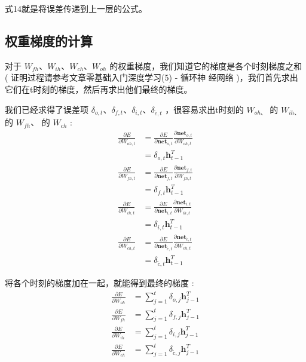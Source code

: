 \documentclass[10.5pt,compsoc]{CjC}
\theoremstyle{mystyle}
\begin{document}
式14就是将误差传递到上一层的公式。\\

{\heiti \subsection{权重梯度的计算} }
对于 $W_{f h} 、 W_{i h} 、 W_{c h} 、 W_{o h}$ 的权重梯度，我们知道它的梯度是各个时刻梯度之和 ( 证明过程请参考文章零基础入门深度学习(5) - 循环神 经网络 )，我们首先求出它们在t时刻的梯度，然后再求出他们最终的梯度。

我们已经求得了误差项 $\delta_{o, t} 、 \delta_{f, t} 、 \delta_{i, t} 、 \delta_{\tilde{c}, t}$ ，很容易求出t时刻的 $W_{o h 、}$ 的 $W_{i h 、}$ 的 $W_{f h} 、$ 的 $W_{c h}$ :
$$
\begin{aligned}
\frac{\partial E}{\partial W_{o h, t}} &=\frac{\partial E}{\partial \mathbf{n e t}_{o, t}} \frac{\partial \mathbf{n e t}_{o, t}}{\partial W_{o h, t}} \\
&=\delta_{o, t} \mathbf{h}_{t-1}^{T} \\
\frac{\partial E}{\partial W_{f h, t}} &=\frac{\partial E}{\partial \mathbf{n e t}_{f, t}} \frac{\partial \mathbf{n e t}_{f, t}}{\partial W_{f h, t}} \\
&=\delta_{f, t} \mathbf{h}_{t-1}^{T} \\
\frac{\partial E}{\partial W_{i h, t}} &=\frac{\partial E}{\partial \mathbf{n e t}_{i, t}} \frac{\partial \mathbf{n e t}_{i, t}}{\partial W_{i h, t}} \\
&=\delta_{i, t} \mathbf{h}_{t-1}^{T} \\
\frac{\partial E}{\partial W_{c h, t}} &=\frac{\partial E}{\partial \mathbf{n e t}_{\tilde{c}, t}} \frac{\partial \mathbf{n e t}_{\tilde{c}, t}}{\partial W_{c h, t}} \\
&=\delta_{\tilde{c}, t} \mathbf{h}_{t-1}^{T}
\end{aligned}
$$

将各个时刻的梯度加在一起，就能得到最终的梯度 :
$$
\begin{aligned}
\frac{\partial E}{\partial W_{o h}} &=\sum_{j=1}^{t} \delta_{o, j} \mathbf{h}_{j-1}^{T} \\
\frac{\partial E}{\partial W_{f h}} &=\sum_{j=1}^{t} \delta_{f, j} \mathbf{h}_{j-1}^{T} \\
\frac{\partial E}{\partial W_{i h}} &=\sum_{j=1}^{t} \delta_{i, j} \mathbf{h}_{j-1}^{T} \\
\frac{\partial E}{\partial W_{c h}} &=\sum_{j=1}^{t} \delta_{\tilde{c}, j} \mathbf{h}_{j-1}^{T}
\end{aligned}
$$
\end{document}
